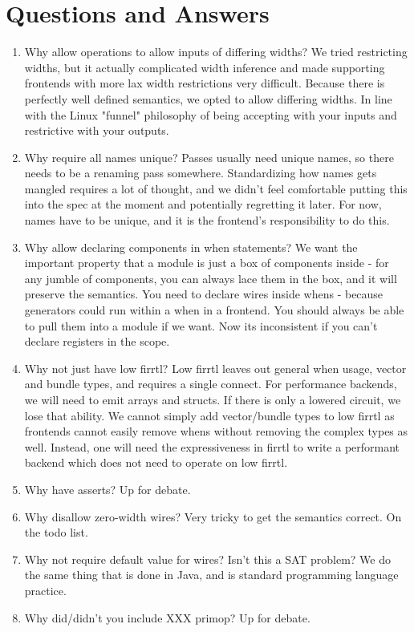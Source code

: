 \documentclass[12pt]{article}
\begin{document}
\section{Questions and Answers}
\begin{enumerate}[topsep=3pt,itemsep=-0.5ex,partopsep=1ex,parsep=1ex]
\item Why allow operations to allow inputs of differing widths? 
We tried restricting widths, but it actually complicated width inference and made supporting frontends with more lax width restrictions very difficult.
Because there is perfectly well defined semantics, we opted to allow differing widths.
In line with the Linux "funnel" philosophy of being accepting with your inputs and restrictive with your outputs.

\item Why require all names unique?
Passes usually need unique names, so there needs to be a renaming pass somewhere.
Standardizing how names gets mangled requires a lot of thought, and we didn't feel comfortable putting this into the spec at the moment and potentially regretting it later.
For now, names have to be unique, and it is the frontend's responsibility to do this.

\item Why allow declaring components in when statements? 
We want the important property that a module is just a box of components inside - for any jumble of components, you can always lace them in the box, and it will preserve the semantics.
You need to declare wires inside whens - because generators could run within a when in a frontend.
You should always be able to pull them into a module if we want.
Now its inconsistent if you can't declare registers in the scope.

\item Why not just have low firrtl?
Low firrtl leaves out general when usage, vector and bundle types, and requires a single connect.
For performance backends, we will need to emit arrays and structs.
If there is only a lowered circuit, we lose that ability.
We cannot simply add vector/bundle types to low firrtl as frontends cannot easily remove whens without removing the complex types as well.
Instead, one will need the expressiveness in firrtl to write a performant backend which does not need to operate on low firrtl.

\item Why have asserts? 
Up for debate.

\item Why disallow zero-width wires? 
Very tricky to get the semantics correct.
On the todo list.

\item Why not require default value for wires? Isn't this a SAT problem?
We do the same thing that is done in Java, and is standard programming language practice.

\item Why did/didn't you include XXX primop?
Up for debate.

\end{enumerate}
\end{document}
